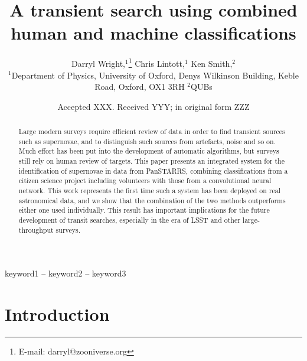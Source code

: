 \documentclass[a4paper,fleqn,usenatbib]{mnras}
\title[Human and machine classifications]{A transient search using combined human and machine classifications}
\author[D. Wright, C. Lintott, K. Smith et al.]{
Darryl Wright,$^{1}$\thanks{E-mail: darryl@zooniverse.org}
Chris Lintott,$^{1}$
Ken Smith,$^{2}$
\\
$^{1}$Department of Physics, University of Oxford, Denys Wilkinson Building, Keble Road, Oxford, OX1 3RH
$^{2}$QUBs
}
\date{Accepted XXX. Received YYY; in original form ZZZ}
\begin{document}
\label{firstpage}
\pagerange{\pageref{firstpage}--\pageref{lastpage}}
\maketitle

\begin{abstract}
Large modern surveys require efficient review of data in order to find transient sources such as supernovae, and to distinguish such sources from artefacts, noise and so on. Much effort has been put into the development of automatic algorithms, but surveys still rely on human review of targets. This paper presents an integrated system for the identification of supernovae in data from PanSTARRS, combining classifications from a citizen science project including volunteers with those from a convolutional neural network. This work represents the first time such a system has been deployed on real astronomical data, and we show that the combination of the two methods outperforms either one used individually. This result has important implications for the future development of transit searches, especially in the era of LSST and other large-throughput surveys. 
\end{abstract}

\begin{keywords}
keyword1 -- keyword2 -- keyword3
\end{keywords}



\section{Introduction}
\end{document}
